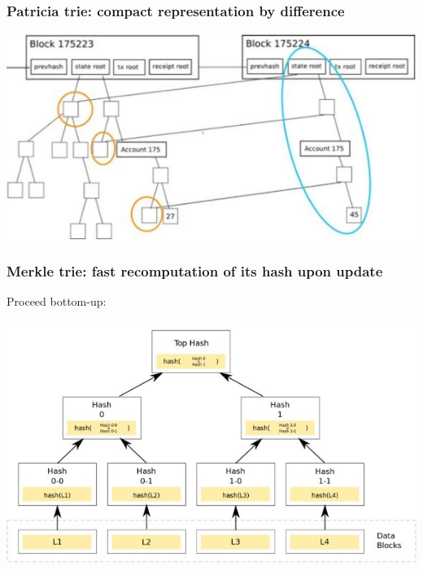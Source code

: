 \documentclass[11pt]{beamer}  %
\begin{document}
\begin{frame}\frametitle{Patricia trie: compact representation by difference}

  \begin{center}
    \includegraphics[scale=0.4,clip=false]{pictures/trie-update.jpg}
  \end{center}

\end{frame}

\begin{frame}\frametitle{Merkle trie: fast recomputation of its hash upon update}

  Proceed bottom-up:
  \begin{center}
    \includegraphics[scale=0.7,clip=false]{pictures/trie-hash.jpg}
  \end{center}

\end{frame}
\end{document}

